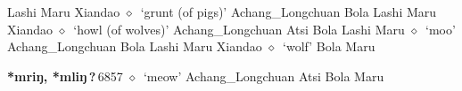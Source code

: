 \begin{list}{}{\leftmargin=1.5em \itemindent=-1.5em}
         Lashi 
\hspace{1ex}
         Maru 
\hspace{1ex}
         Xiandao 
\hspace{1ex}
         $\diamond$~`grunt (of pigs)'
         Achang\_Longchuan 
\hspace{1ex}
         Bola 
\hspace{1ex}
         Lashi 
\hspace{1ex}
         Maru 
\hspace{1ex}
         Xiandao 
\hspace{1ex}
         $\diamond$~`howl (of wolves)'
         Achang\_Longchuan 
\hspace{1ex}
         Atsi 
\hspace{1ex}
         Bola 
\hspace{1ex}
         Lashi 
\hspace{1ex}
         Maru 
\hspace{1ex}
         $\diamond$~`moo'
         Achang\_Longchuan 
\hspace{1ex}
         Bola 
\hspace{1ex}
         Lashi 
\hspace{1ex}
         Maru 
\hspace{1ex}
         Xiandao 
\hspace{1ex}
         $\diamond$~`wolf'
         Bola 
\hspace{1ex}
         Maru 
  \item {\footnotesize \textbf{*mriŋ, *mliŋ\,?\,}}{\tiny 6857}
\hspace{1ex}
         $\diamond$~`meow'
         Achang\_Longchuan 
\hspace{1ex}
         Atsi 
\hspace{1ex}
         Bola 
\hspace{1ex}
         Maru 
\hspace{1ex}

\end{list}
